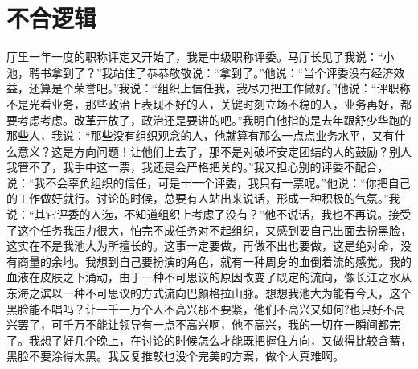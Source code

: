 \documentclass[12pt,oneside]{book}
\begin{document}
\chapter{不合逻辑}

厅里一年一度的职称评定又开始了，我是中级职称评委。马厅长见了我说：``小池，聘书拿到了？''我站住了恭恭敬敬说：``拿到了。''他说：``当个评委没有经济效益，还算是个荣誉吧。''我说：``组织上信任我，我尽力把工作做好。''他说：``评职称不是光看业务，那些政治上表现不好的人，关键时刻立场不稳的人，业务再好，都要考虑考虑。改革开放了，政治还是要讲的吧。''我明白他指的是去年跟舒少华跑的那些人，我说：``那些没有组织观念的人，他就算有那么一点点业务水平，又有什么意义？这是方向问题！让他们上去了，那不是对破坏安定团结的人的鼓励？别人我管不了，我手中这一票，我还是会严格把关的。''我又担心别的评委不配合，说：``我不会辜负组织的信任，可是十一个评委，我只有一票呢。''他说：``你把自己的工作做好就行。讨论的时候，总要有人站出来说话，形成一种积极的气氛。''我说：``其它评委的人选，不知道组织上考虑了没有？''他不说话，我也不再说。接受了这个任务我压力很大，怕完不成任务对不起组织，又感到要自己出面去扮黑脸，这实在不是我池大为所擅长的。这事一定要做，再做不出也要做，这是绝对命，没有商量的余地。我想到自己要扮演的角色，就有一种周身的血倒着流的感觉。我的血液在皮肤之下涌动，由于一种不可思议的原因改变了既定的流向，像长江之水从东海之滨以一种不可思议的方式流向巴颜格拉山脉。想想我池大为能有今天，这个黑脸能不唱吗？让一千一万个人不高兴那不要紧，他们不高兴又如何?也只好不高兴罢了，可千万不能让领导有一点不高兴啊，他不高兴，我的一切在一瞬间都完了。我想了好几个晚上，在讨论的时候怎么才能既把握住方向，又做得比较含蓄，黑脸不要涂得太黑。我反复推敲也没个完美的方案，做个人真难啊。
\end{document}
